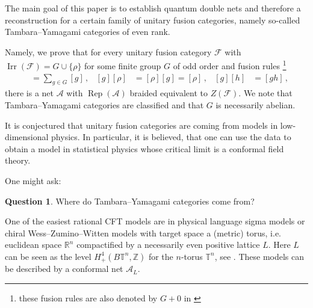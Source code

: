 \documentclass[twoside,11pt,reqno]{amsart}
\makeatletter
\theoremstyle{definition}
\newtheorem{question}[thm]{Question}
\theoremstyle{remark}
\newcommand{\cF}{\mathcal{F}}
\newcommand{\A}{\mathcal{A}}
\newcommand{\RR}{\mathbb{R}}
\newcommand{\TT}{\mathbb{T}}
\newcommand{\ZZ}{\mathbb{Z}}
\DeclareMathOperator{\Rep}{Rep}
\DeclareRobustCommand{\ie}{i.e.\@\xspace}
\DeclareMathOperator{\Irr}{Irr}
\makeatother
\begin{document}
The main goal of this paper is to establish quantum double nets and 
therefore a reconstruction for a certain family of unitary fusion categories, 
namely so-called Tambara--Yamagami categories of even rank.

Namely, we prove that for every unitary fusion category $\cF$ with
$\Irr(\cF)=G\cup \{\rho\}$
for some finite group $G$ of odd order and fusion rules
\footnote{these fusion rules are also denoted by $G+0$ in \cite{EvGa2014}}
\begin{align}  
  [\rho] [\rho]&=\sum_{g\in G} [g]\,,&
  [g][\rho]&=[\rho] [g] =[\rho]\,,&
  [g] [h]& =[gh]\,,
\end{align}
there is a net $\A$ with $\Rep(\A)$ braided equivalent to $Z(\cF)$.
We note that Tambara--Yamagami categories are classified \cite{TaYa1998}
and that $G$ is necessarily abelian.

It is conjectured that unitary fusion categories are coming from models in 
low-dimensional physics.
In particular, it is believed, that one can use the data to obtain a model in 
statistical physics whose critical limit is a conformal field theory.

One might ask:
\begin{question}
  \label{quest:TY}
  Where do Tambara--Yamagami categories come from?
\end{question}
One of the easiest rational CFT models are in physical language sigma models 
 or chiral Wess--Zumino--Witten models
with target space a (metric) torus,
\ie euclidean space $\RR^n$ compactified by a necessarily even positive lattice $L$.
Here $L$ can be seen as the level $H_+^4(B\TT^n,\ZZ)$ for the $n$-torus $\TT^n$,
see \cite{He2016pp}.
%
%
%
These models can be described by a conformal net $\A_L$.
\end{document}
